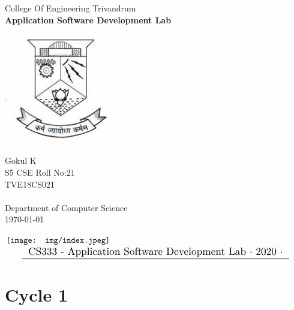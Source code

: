 \documentclass{article}
\begin{document}

\begin{titlepage}
\begin{center}
{\LARGE College Of Engineering Trivandrum}\\[3cm]
\linespread{1.2}\huge {\bfseries Application Software Development Lab}\\[3cm]
\linespread{1}
\includegraphics[width=5cm]{img/emblem.jpeg}\\[3cm]
{\Large Gokul K\\ S5  CSE Roll No:21\\ TVE18CS021 }\\[1cm]


\textit{ }\\[2cm]
Department of Computer Science\\[0.2cm]
\today
\end{center}

\end{titlepage}

\newpage

\begin{frame}{}
    \centering
    \hspace*{-0.5cm}
    $\vcenter{\hbox{\texttt{[image: img/index.jpeg]}}}$
    $\vcenter{\resizebox{0.95\textwidth}{!}{
        \begin{tabular}{c}
             CS333 - Application Software Development Lab $\cdot$ 2020 $\cdot$   \\
             \hline 
        \end{tabular}
    }}$
\end{frame}
\section*{Cycle 1}
\end{document}
